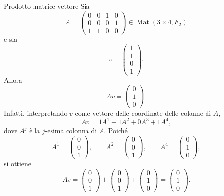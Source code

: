 \documentclass[a4paper]{article}
\begin{document}
\begin{snippetexample}{Prodotto matrice-vettore}
    Sia
    \[
        A=
        \begin{pmatrix}
            0 & 0 & 1 & 0\\
            0 & 0 & 0 & 1\\
            1 & 1 & 0 & 0
        \end{pmatrix}
        \in
        \operatorname{Mat}(3\times 4,F_2)
    \]
    e sia
    \[
        v=
        \begin{pmatrix}
            1\\
            1\\
            0\\
            1
        \end{pmatrix}.
    \]
    Allora
    \[
        Av
        =
        \begin{pmatrix}
            0\\
            1\\
            0
        \end{pmatrix}.
    \]
    Infatti, interpretando \(v\) come vettore delle coordinate delle colonne di \(A\),
    \[
        Av
        =
        1A^1+1A^2+0A^3+1A^4,
    \]
    dove \(A^j\) è la \(j\)-esima colonna di \(A\). Poiché
    \[
        A^1=
        \begin{pmatrix}
            0\\0\\1
        \end{pmatrix},
        \qquad
        A^2=
        \begin{pmatrix}
            0\\0\\1
        \end{pmatrix},
        \qquad
        A^4=
        \begin{pmatrix}
            0\\1\\0
        \end{pmatrix},
    \]
    si ottiene
    \[
        Av
        =
        \begin{pmatrix}
            0\\0\\1
        \end{pmatrix}
        +
        \begin{pmatrix}
            0\\0\\1
        \end{pmatrix}
        +
        \begin{pmatrix}
            0\\1\\0
        \end{pmatrix}
        =
        \begin{pmatrix}
            0\\1\\0
        \end{pmatrix}.
    \]
\end{snippetexample}
\end{document}
